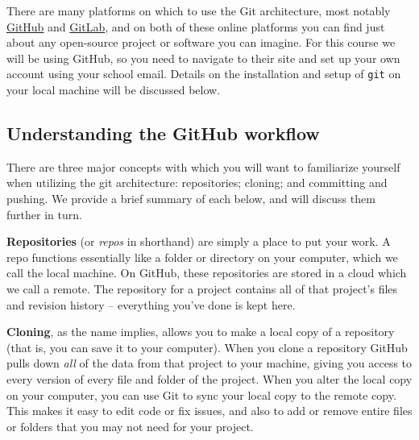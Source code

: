 \documentclass{tufte-book}
\begin{document}
There are many platforms on which to use the Git architecture, most notably {\href{https://www.github.com}{GitHub}} and {\href{https://www.gitlab.com}{GitLab}}, and on both of these online platforms you can find just about any open-source project or software you can imagine. For this course we will be using GitHub, so you need to navigate to their site and set up your own account using your school email. Details on the installation and setup of \verb|git| on your local machine will be discussed below.

\subsection{Understanding the GitHub workflow}\label{subsec:git-workflow} %

{There are three} major concepts with which you will want to familiarize yourself when utilizing the git architecture: repositories; cloning; and committing and pushing. We provide a brief summary of each below, and will discuss them further in turn.

\textbf{Repositories} (or \textit{repos} in shorthand) are simply a place to put your work. A repo functions essentially like a folder or directory on your computer, which we call the local machine. On GitHub, these repositories are stored in a cloud which we call a remote. The repository for a project contains all of that project's files and revision history -- everything you've done is kept here. 

\textbf{Cloning}, as the name implies, allows you to make a local copy of a repository (that is, you can save it to your computer). When you clone a repository GitHub pulls down \textit{all} of the data from that project to your machine, giving you access to every version of every file and folder of the project. When you alter the local copy on your computer, you can use Git to sync your local copy to the remote copy. This makes it easy to edit code or fix issues, and also to add or remove entire files or folders that you may not need for your project. %
\end{document}
